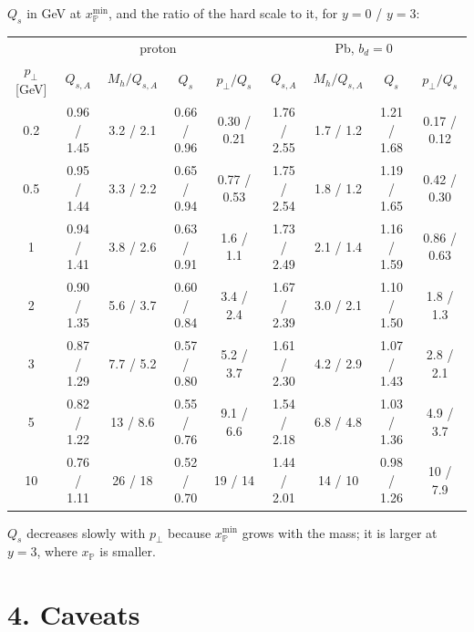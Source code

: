\documentclass[12pt]{article}
\newcommand{\xpo}{x_{\mathbb{P}}}
\begin{document}
$Q_s$ in GeV at $\xpo^{\min}$, and the ratio of the hard scale to it, for $y=0$ / $y=3$:
\begin{center}
\small
\begin{tabular}{c|cc|cc|cc|cc}
\toprule
 & \multicolumn{4}{c|}{proton} & \multicolumn{4}{c}{Pb, $b_d=0$} \\
$p_\perp$ [GeV] & $Q_{s,A}$ & $M_h/Q_{s,A}$ & $Q_s$ & $p_\perp/Q_s$
 & $Q_{s,A}$ & $M_h/Q_{s,A}$ & $Q_s$ & $p_\perp/Q_s$ \\
\midrule
0.2 & 0.96 / 1.45 & 3.2 / 2.1 & 0.66 / 0.96 & 0.30 / 0.21 & 1.76 / 2.55 & 1.7 / 1.2 & 1.21 / 1.68 & 0.17 / 0.12 \\
0.5 & 0.95 / 1.44 & 3.3 / 2.2 & 0.65 / 0.94 & 0.77 / 0.53 & 1.75 / 2.54 & 1.8 / 1.2 & 1.19 / 1.65 & 0.42 / 0.30 \\
1   & 0.94 / 1.41 & 3.8 / 2.6 & 0.63 / 0.91 & 1.6 / 1.1   & 1.73 / 2.49 & 2.1 / 1.4 & 1.16 / 1.59 & 0.86 / 0.63 \\
2   & 0.90 / 1.35 & 5.6 / 3.7 & 0.60 / 0.84 & 3.4 / 2.4   & 1.67 / 2.39 & 3.0 / 2.1 & 1.10 / 1.50 & 1.8 / 1.3 \\
3   & 0.87 / 1.29 & 7.7 / 5.2 & 0.57 / 0.80 & 5.2 / 3.7   & 1.61 / 2.30 & 4.2 / 2.9 & 1.07 / 1.43 & 2.8 / 2.1 \\
5   & 0.82 / 1.22 & 13 / 8.6  & 0.55 / 0.76 & 9.1 / 6.6   & 1.54 / 2.18 & 6.8 / 4.8 & 1.03 / 1.36 & 4.9 / 3.7 \\
10  & 0.76 / 1.11 & 26 / 18   & 0.52 / 0.70 & 19 / 14     & 1.44 / 2.01 & 14 / 10   & 0.98 / 1.26 & 10 / 7.9 \\
\bottomrule
\end{tabular}
\end{center}
$Q_s$ decreases slowly with $p_\perp$ because $\xpo^{\min}$ grows with the mass; it is larger at $y=3$,
where $\xpo$ is smaller.

\section*{4. Caveats}
\end{document}

